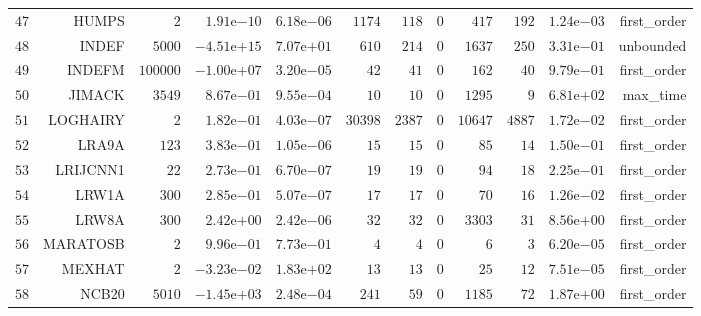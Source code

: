 \begin{longtable}{rrrrrrrrrrrr}
  \(    47\) & HUMPS & \(     2\) & \( 1.91\)e\(-10\) & \( 6.18\)e\(-06\) & \(  1174\) & \(   118\) & \(     0\) & \(   417\) & \(   192\) & \( 1.24\)e\(-03\) & first\_order \\
  \(    48\) & INDEF & \(  5000\) & \(-4.51\)e\(+15\) & \( 7.07\)e\(+01\) & \(   610\) & \(   214\) & \(     0\) & \(  1637\) & \(   250\) & \( 3.31\)e\(-01\) & unbounded \\
  \(    49\) & INDEFM & \(100000\) & \(-1.00\)e\(+07\) & \( 3.20\)e\(-05\) & \(    42\) & \(    41\) & \(     0\) & \(   162\) & \(    40\) & \( 9.79\)e\(-01\) & first\_order \\
  \(    50\) & JIMACK & \(  3549\) & \( 8.67\)e\(-01\) & \( 9.55\)e\(-04\) & \(    10\) & \(    10\) & \(     0\) & \(  1295\) & \(     9\) & \( 6.81\)e\(+02\) & max\_time \\
  \(    51\) & LOGHAIRY & \(     2\) & \( 1.82\)e\(-01\) & \( 4.03\)e\(-07\) & \( 30398\) & \(  2387\) & \(     0\) & \( 10647\) & \(  4887\) & \( 1.72\)e\(-02\) & first\_order \\
  \(    52\) & LRA9A & \(   123\) & \( 3.83\)e\(-01\) & \( 1.05\)e\(-06\) & \(    15\) & \(    15\) & \(     0\) & \(    85\) & \(    14\) & \( 1.50\)e\(-01\) & first\_order \\
  \(    53\) & LRIJCNN1 & \(    22\) & \( 2.73\)e\(-01\) & \( 6.70\)e\(-07\) & \(    19\) & \(    19\) & \(     0\) & \(    94\) & \(    18\) & \( 2.25\)e\(-01\) & first\_order \\
  \(    54\) & LRW1A & \(   300\) & \( 2.85\)e\(-01\) & \( 5.07\)e\(-07\) & \(    17\) & \(    17\) & \(     0\) & \(    70\) & \(    16\) & \( 1.26\)e\(-02\) & first\_order \\
  \(    55\) & LRW8A & \(   300\) & \( 2.42\)e\(+00\) & \( 2.42\)e\(-06\) & \(    32\) & \(    32\) & \(     0\) & \(  3303\) & \(    31\) & \( 8.56\)e\(+00\) & first\_order \\
  \(    56\) & MARATOSB & \(     2\) & \( 9.96\)e\(-01\) & \( 7.73\)e\(-01\) & \(     4\) & \(     4\) & \(     0\) & \(     6\) & \(     3\) & \( 6.20\)e\(-05\) & first\_order \\
  \(    57\) & MEXHAT & \(     2\) & \(-3.23\)e\(-02\) & \( 1.83\)e\(+02\) & \(    13\) & \(    13\) & \(     0\) & \(    25\) & \(    12\) & \( 7.51\)e\(-05\) & first\_order \\
  \(    58\) & NCB20 & \(  5010\) & \(-1.45\)e\(+03\) & \( 2.48\)e\(-04\) & \(   241\) & \(    59\) & \(     0\) & \(  1185\) & \(    72\) & \( 1.87\)e\(+00\) & first\_order \\

\end{longtable}
